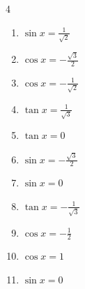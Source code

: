 \begin{multicols}{4}
\begin{enumerate}

  \item $\displaystyle \sin{x}  = \frac{1}{\sqrt{2}}$


\columnbreak %

\resetques

  \item $\displaystyle \cos{x}  = -\frac{\sqrt{3}}{2}$


  \item $\displaystyle \cos{x}  = -\frac{1}{\sqrt{2}}$


  \item $\displaystyle \tan{x}  = \frac{1}{\sqrt{3}}$


  \item $\displaystyle \tan{x}  = 0$


  \item $\displaystyle \sin{x}  = -\frac{\sqrt{3}}{2}$


  \item $\displaystyle \sin{x}  = 0$


  \item $\displaystyle \tan{x}  = -\frac{1}{\sqrt{3}}$


  \item $\displaystyle \cos{x}  = -\frac{1}{2}$


  \item $\displaystyle \cos{x}  = 1$


  \item $\displaystyle \sin{x}  = 0$


\end{enumerate}
\end{multicols}
